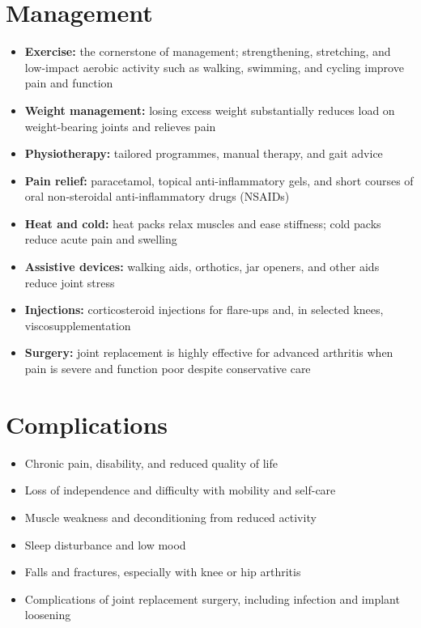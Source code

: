 \section*{Management}
\begin{itemize}
    \item \textbf{Exercise:} the cornerstone of management; strengthening, stretching, and low-impact aerobic activity such as walking, swimming, and cycling improve pain and function
    \item \textbf{Weight management:} losing excess weight substantially reduces load on weight-bearing joints and relieves pain
    \item \textbf{Physiotherapy:} tailored programmes, manual therapy, and gait advice
    \item \textbf{Pain relief:} paracetamol, topical anti-inflammatory gels, and short courses of oral non-steroidal anti-inflammatory drugs (NSAIDs)
    \item \textbf{Heat and cold:} heat packs relax muscles and ease stiffness; cold packs reduce acute pain and swelling
    \item \textbf{Assistive devices:} walking aids, orthotics, jar openers, and other aids reduce joint stress
    \item \textbf{Injections:} corticosteroid injections for flare-ups and, in selected knees, viscosupplementation
    \item \textbf{Surgery:} joint replacement is highly effective for advanced arthritis when pain is severe and function poor despite conservative care
\end{itemize}

\section*{Complications}
\begin{itemize}
    \item Chronic pain, disability, and reduced quality of life
    \item Loss of independence and difficulty with mobility and self-care
    \item Muscle weakness and deconditioning from reduced activity
    \item Sleep disturbance and low mood
    \item Falls and fractures, especially with knee or hip arthritis
    \item Complications of joint replacement surgery, including infection and implant loosening
\end{itemize}

